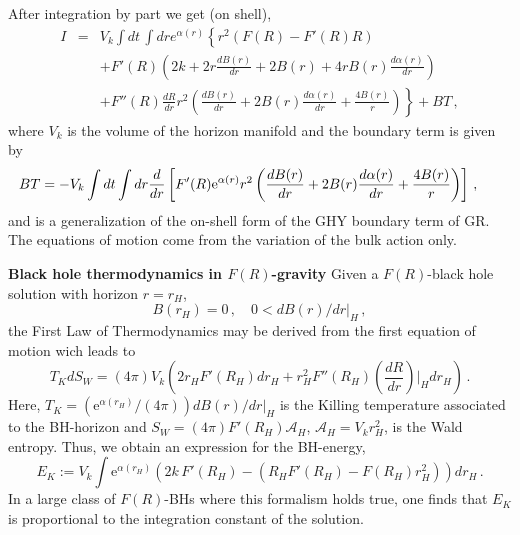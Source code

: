 \documentclass[ignorenonframetext,slidestop,compress]{beamer}
\begin{document}
\begin{frame}
After integration by part we get (on shell),
\begin{eqnarray*}
 I &=&V_k\int dt\,\int dr e^{\alpha(r)}\left\{r^2\left(F(R)-F'(R)R\right)
\right.\nonumber\\ &&\left.
 +F'(R)\left(2k+2 r\frac{d B(r)}{dr}+2 B(r)+4r B(r)\frac{d\alpha(r)}
{d r}\right)\right.
\nonumber\\
&& +\left.F''(R)\frac{d R}{d r}r^2\left(\frac{d B(r)}{d r}+2B(r)\frac{d \alpha(r)}{dr}+\frac{4B(r)}{r}\right)\right\}+BT\,,
\end{eqnarray*}
where $V_k$ is the volume of the horizon manifold and the boundary term is given by
\begin{equation*}
\hspace{-0.6cm}BT =
-V_k \int  dt \int dr \frac{d}{dr}\left[
F'(R)\text{e}^{\alpha(r)}r^2\left(\frac{d B(r)}{d r}+2 B(r)\frac{d\alpha(r)}{d r}+\frac{4 B(r)}{r}\right)
\right]\,,
\label{BT}
\end{equation*}
and is a generalization of the on-shell form of the GHY boundary term of GR.
The equations of motion come from the variation 
of the bulk action only.
\end{frame}

\begin{frame}
{\bf Black hole thermodynamics in $F(R)$-gravity}
Given a $F(R)$-black hole solution with horizon $r=r_H$,
\begin{equation*}
B(r_H)=0\,,\quad 0<d B(r)/d r|_H\,, 
\end{equation*}
the First Law of Thermodynamics may be derived from the first equation of motion wich leads to
\begin{equation*}
 T_K d S_W= \left(4\pi\right)V_k\left(2 r_H F'(R_H)dr_H+r_H^2 F''(R_H)\left(\frac{d R}{dr}\right)\Big\vert_H dr_H\right)\,.
\end{equation*}
Here, $T_K=(\text{e}^{\alpha(r_H)}/(4\pi) )d B(r)/dr|_H$ is the Killing temperature associated to the BH-horizon and 
$S_W=(4\pi) F'(R_H)\mathcal A_H$, $\mathcal A_H=V_k r_H^2$, is the Wald entropy. Thus, we obtain an expression for the BH-energy,
\begin{equation*}
E_K:=V_k\int  \text{e}^{\alpha(r_H)}\left(2 k\,F'(R_H)-\left(R_H F'(R_H)-F(R_H)r_H^2\right)\right)d r_H\,.
\end{equation*}
In a large class of $F(R)$-BHs where this formalism holds true, one finds that $E_K$ is proportional to the integration constant of the solution.
\end{frame}
\end{document}
